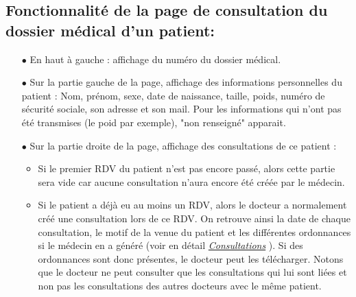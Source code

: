\documentclass[a4paper]{report}
\begin{document}
\subsection{{Fonctionnalité de la page de consultation du dossier médical d'un patient}:}\label{dossier médical}
\begin{itemize}
    \item[$\bullet$] En haut à gauche : affichage du numéro du dossier médical.
    \item[$\bullet$] Sur la partie gauche de la page, affichage des informations personnelles du patient : Nom, prénom, sexe, date de naissance, taille, poids,
    numéro de sécurité sociale, son adresse et son mail. Pour les informations qui n'ont pas été transmises (le poid par exemple), "non renseigné" apparait.
    \item[$\bullet$] Sur la partie droite de la page, affichage des consultations de ce patient : 
    \begin{itemize}
        \item Si le premier RDV du patient n'est pas encore passé, alors cette partie sera vide car aucune consultation n'aura encore été créée par le médecin.
        \item Si le patient a déjà eu au moins un RDV, alors le docteur a normalement créé une consultation lors de ce RDV. On retrouve ainsi la date de chaque consultation,
        le motif de la venue du patient et les différentes ordonnances si le médecin en a généré (voir en détail \textit{{\hyperref[consultation]{Consultations}}} ). Si des ordonnances
        sont donc présentes, le docteur peut les télécharger. Notons que le docteur ne peut consulter que les consultations qui lui sont liées et non pas les consultations des 
        autres docteurs avec le même patient.
    \end{itemize}
\end{itemize}
\vspace{3mm}
    
\end{document}
